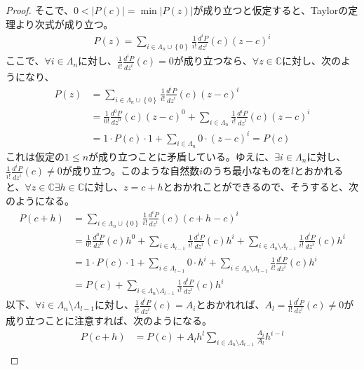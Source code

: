 \documentclass[dvipdfmx]{jsarticle}
\begin{document}
\begin{proof}
そこで、$0 < \left| P(c) \right| = \min\left| P(z) \right|$が成り立つと仮定すると、Taylorの定理より次式が成り立つ。
\begin{align*}
P(z) = \sum_{i \in \varLambda_{n} \cup \left\{ 0 \right\}} {\frac{1}{i!}\frac{d^{i}P}{{dz}^{i}}(c)(z - c)^{i}}
\end{align*}
ここで、$\forall i \in \varLambda_{n}$に対し、$\frac{1}{i!}\frac{d^{i}P}{{dz}^{i}}(c) = 0$が成り立つなら、$\forall z \in \mathbb{C}$に対し、次のようになり、
\begin{align*}
P(z) &= \sum_{i \in \varLambda_{n} \cup \left\{ 0 \right\}} {\frac{1}{i!}\frac{d^{i}P}{{dz}^{i}}(c)(z - c)^{i}}\\
&= \frac{1}{0!}\frac{d^{0}P}{{dz}^{0}}(c)(z - c)^{0} + \sum_{i \in \varLambda_{n}} {\frac{1}{i!}\frac{d^{i}P}{{dz}^{i}}(c)(z - c)^{i}}\\
&= 1 \cdot P(c) \cdot 1 + \sum_{i \in \varLambda_{n}} {0 \cdot (z - c)^{i}} = P(c)
\end{align*}
これは仮定の$1 \leq n$が成り立つことに矛盾している。ゆえに、$\exists i \in \varLambda_{n}$に対し、$\frac{1}{i!}\frac{d^{i}P}{{dz}^{i}}(c) \neq 0$が成り立つ。このような自然数$i$のうち最小なものを$l$とおかれると、$\forall z \in \mathbb{C}\exists h \in \mathbb{C}$に対し、$z = c + h$とおかれことができるので、そうすると、次のようになる。
\begin{align*}
P(c + h) &= \sum_{i \in \varLambda_{n} \cup \left\{ 0 \right\}} {\frac{1}{i!}\frac{d^{i}P}{{dz}^{i}}(c)(c + h - c)^{i}}\\
&= \frac{1}{0!}\frac{d^{0}P}{{dz}^{0}}(c)h^{0} + \sum_{i \in \varLambda_{l - 1}} {\frac{1}{i!}\frac{d^{i}P}{{dz}^{i}}(c)h^{i}} + \sum_{i \in \varLambda_{n} \setminus \varLambda_{l - 1}} {\frac{1}{i!}\frac{d^{i}P}{{dz}^{i}}(c)h^{i}}\\
&= 1 \cdot P(c) \cdot 1 + \sum_{i \in \varLambda_{l - 1}} {0 \cdot h^{i}} + \sum_{i \in \varLambda_{n} \setminus \varLambda_{l - 1}} {\frac{1}{i!}\frac{d^{i}P}{{dz}^{i}}(c)h^{i}}\\
&= P(c) + \sum_{i \in \varLambda_{n} \setminus \varLambda_{l - 1}} {\frac{1}{i!}\frac{d^{i}P}{{dz}^{i}}(c)h^{i}}
\end{align*}
以下、$\forall i \in \varLambda_{n} \setminus \varLambda_{l - 1}$に対し、$\frac{1}{i!}\frac{d^{i}P}{{dz}^{i}}(c) = A_{i}$とおかれれば、$A_{l} = \frac{1}{l!}\frac{d^{l}P}{{dz}^{l}}(c) \neq 0$が成り立つことに注意すれば、次のようになる。
\begin{align*}
P(c + h) &= P(c) + A_{l}h^{l}\sum_{i \in \varLambda_{n} \setminus \varLambda_{l - 1}} {\frac{A_{i}}{A_{l}}h^{i - l}}\\

\end{align*}
\end{proof}
\end{document}
